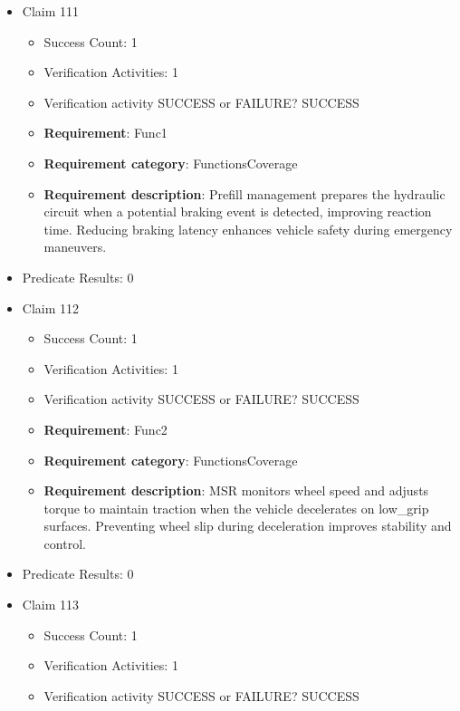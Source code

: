 \documentclass{article}
\begin{document}
\begin{itemize}
  				  \item Claim 111
				\begin{itemize}
			    	\item Success Count: 1 
			    	\item Verification Activities: 1
					\item Verification activity SUCCESS or FAILURE? SUCCESS
		
						\item \textbf{Requirement}: Func1 
						\item \textbf{Requirement category}: FunctionsCoverage 
						\item \textbf{Requirement description}: Prefill management prepares the hydraulic circuit when a potential braking event is detected, improving reaction time. Reducing braking latency enhances vehicle safety during emergency maneuvers.
					
				\end{itemize}
				
									    
				\item Predicate Results: 0

  				  \item Claim 112
				\begin{itemize}
			    	\item Success Count: 1 
			    	\item Verification Activities: 1
					\item Verification activity SUCCESS or FAILURE? SUCCESS
		
						\item \textbf{Requirement}: Func2 
						\item \textbf{Requirement category}: FunctionsCoverage 
						\item \textbf{Requirement description}: MSR monitors wheel speed and adjusts torque to maintain traction when the vehicle decelerates on low_grip surfaces. Preventing wheel slip during deceleration improves stability and control.
					
				\end{itemize}
				
									    
				\item Predicate Results: 0

  				  \item Claim 113
				\begin{itemize}
			    	\item Success Count: 1 
			    	\item Verification Activities: 1
					\item Verification activity SUCCESS or FAILURE? SUCCESS
		

\end{itemize}
\end{itemize}
\end{document}
